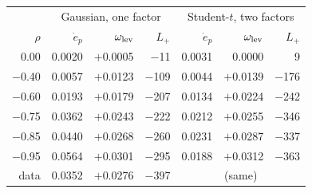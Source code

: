 \begin{ruledtabular}
\begin{tabular}{rrrrrrr}
 & \multicolumn{3}{c}{Gaussian, one factor} & \multicolumn{3}{c}{Student-$t$, two factors}\\
$\rho$ & $\dot e_p$ & $\omega_{\rm lev}$ & $L_+$ & $\dot e_p$ & $\omega_{\rm lev}$ & $L_+$\\
\hline
0.00 & 0.0020 & $+$0.0005 & $-$11 & 0.0031 & 0.0000 & 9\\
$-$0.40 & 0.0057 & $+$0.0123 & $-$109 & 0.0044 & $+$0.0139 & $-$176\\
$-$0.60 & 0.0193 & $+$0.0179 & $-$207 & 0.0134 & $+$0.0224 & $-$242\\
$-$0.75 & 0.0362 & $+$0.0243 & $-$222 & 0.0212 & $+$0.0255 & $-$346\\
$-$0.85 & 0.0440 & $+$0.0268 & $-$260 & 0.0231 & $+$0.0287 & $-$337\\
$-$0.95 & 0.0564 & $+$0.0301 & $-$295 & 0.0188 & $+$0.0312 & $-$363\\
\hline
data & 0.0352 & $+$0.0276 & $-$397 & \multicolumn{3}{c}{(same)}\\
\end{tabular}
\end{ruledtabular}
